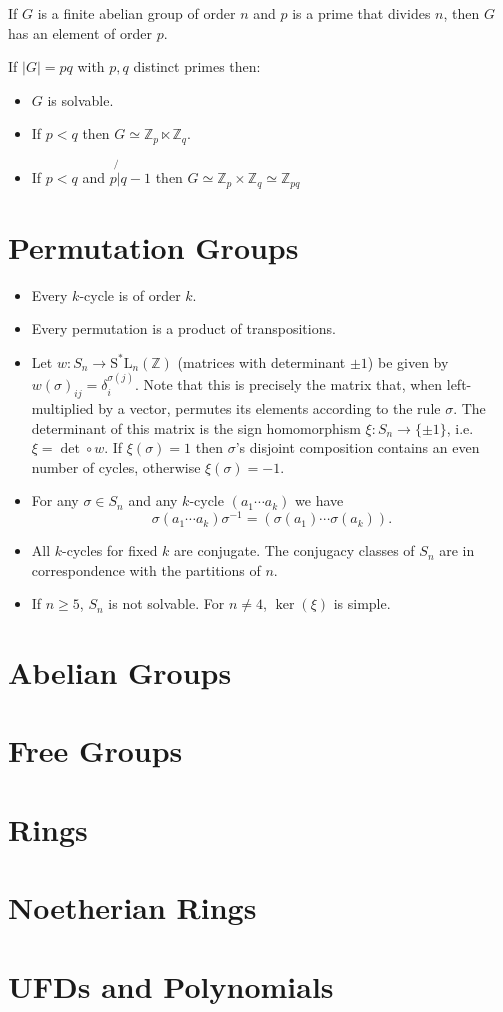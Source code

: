 \documentclass{article}
\begin{document}
If $G$ is a finite abelian group of order $n$ and $p$ is a prime that
divides $n$, then $G$ has an element of order $p$.

If $|G| = pq$ with $p, q$ distinct primes then:
\begin{itemize}
  \item{
    $G$ is solvable.
  }
  \item{
    If $p < q$ then $G \simeq \mathbb{Z}_p \ltimes \mathbb{Z}_q$.
  }
  \item{
    If $p < q$ and $p \not{\vert} q - 1$ then
    $G \simeq \mathbb{Z}_p \times \mathbb{Z}_q
       \simeq \mathbb{Z}_{pq}$
  }
\end{itemize}

\section{Permutation Groups}
\begin{itemize}
  \item{
    Every $k$-cycle is of order $k$.
  }
  \item{
    Every permutation is a product of transpositions.
  }
  \item{
    Let $w : S_n \to \mathrm{S^\ast L}_n(\mathbb{Z})$ (matrices with
    determinant $\pm 1$) be given by $w(\sigma)_{ij} =
    \delta_i^{\sigma(j)}$. Note that this is precisely the matrix that,
    when left-multiplied by a vector, permutes its elements according to
    the rule $\sigma$. The determinant of this matrix is the sign
    homomorphism $\xi : S_n \to \{ \pm 1 \}$, i.e. $\xi = \det \circ
    w$. If $\xi(\sigma) = 1$ then $\sigma$'s disjoint composition
    contains an even number of cycles, otherwise $\xi(\sigma) = -1$.
  }
  \item{
    For any $\sigma \in S_n$ and any $k$-cycle $(a_1 \cdots a_k)$ we
    have
    $$
    \sigma (a_1 \cdots a_k) \sigma^{-1}
  = (\sigma(a_1) \cdots \sigma(a_k)).
    $$
  }
  \item{
    All $k$-cycles for fixed $k$ are conjugate.
    The conjugacy classes of $S_n$ are in correspondence with the
    partitions of $n$.
  }
  \item{
    If $n \geq 5$, $S_n$ is not solvable. For $n \neq 4$,
    $\ker(\xi)$ is simple.
  }
\end{itemize}

\section{Abelian Groups}

\section{Free Groups}

\section{Rings}

\section{Noetherian Rings}

\section{UFDs and Polynomials}
\end{document}
